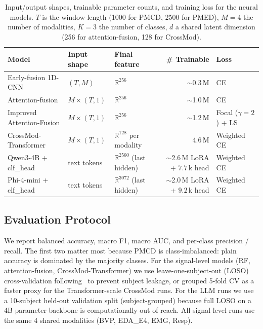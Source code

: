 \documentclass{article}
\begin{document}
\begin{table}[t]
\centering
\caption{Input/output shapes, trainable parameter counts, and training loss for the neural models. $T$ is the window length (1000 for PMCD, 2500 for PMED), $M = 4$ the number of modalities, $K = 3$ the number of classes, $d$ a shared latent dimension (256 for attention-fusion, 128 for CrossMod).}
\label{tab:shapes_params}
\small
\begin{tabular}{@{}lllrl@{}}
\toprule
\textbf{Model} & \textbf{Input shape} & \textbf{Final feature} & \textbf{\# Trainable} & \textbf{Loss} \\
\midrule
Early-fusion 1D-CNN        & $(T, M)$   & $\mathbb{R}^{256}$                 & $\sim$0.3\,M  & CE \\
Attention-fusion           & $M \times (T, 1)$ & $\mathbb{R}^{256}$           & $\sim$1.0\,M  & CE \\
Improved Attention-Fusion  & $M \times (T, 1)$ & $\mathbb{R}^{256}$           & $\sim$1.2\,M  & Focal ($\gamma{=}2$) + LS \\
CrossMod-Transformer       & $M \times (T, 1)$ & $\mathbb{R}^{128}$ per modality  & 4.6\,M        & Weighted CE \\
Qwen3-4B + clf\_head       & text tokens      & $\mathbb{R}^{2560}$ (last hidden) & $\sim$2.6\,M LoRA + $7.7$\,k head & Weighted CE \\
Phi-4-mini + clf\_head     & text tokens      & $\mathbb{R}^{3072}$ (last hidden) & $\sim$2.0\,M LoRA + $9.2$\,k head & Weighted CE \\
\bottomrule
\end{tabular}
\end{table}

\subsection{Evaluation Protocol}

We report balanced accuracy, macro F1, macro AUC, and per-class precision / recall. The first two matter most because PMCD is class-imbalanced: plain accuracy is dominated by the majority classes. For the signal-level models (RF, attention-fusion, CrossMod-Transformer) we use leave-one-subject-out (LOSO) cross-validation following~\citet{gouverneur2024painmonit} to prevent subject leakage, or grouped 5-fold CV as a faster proxy for the Transformer-scale CrossMod runs. For the LLM runs we use a 10-subject held-out validation split (subject-grouped) because full LOSO on a 4B-parameter backbone is computationally out of reach. All signal-level runs use the same 4 shared modalities (BVP, EDA\_E4, EMG, Resp).
\end{document}
